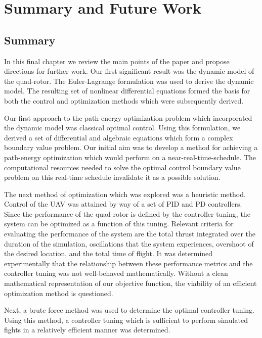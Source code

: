 
\chapter{Summary and Future Work} %

\label{Chapter8}


\section{Summary}
In this final chapter we review the main points of the paper and propose directions for further work. Our first significant result was the dynamic model of the quad-rotor. The Euler-Lagrange formulation was used to derive the dynamic model. The resulting set of nonlinear differential equations formed the basis for both the control and optimization methods which were subsequently derived.

Our first approach to the path-energy optimization problem which incorporated the dynamic model was classical optimal control. Using this formulation, we derived a set of differential and algebraic equations which form a complex boundary value problem. Our initial aim was to develop a method for achieving a path-energy optimization which would perform on a near-real-time-schedule. The computational resources needed to solve the optimal control boundary value problem on this real-time schedule invalidate it as a possible solution.

The next method of optimization which was explored was a heuristic method. Control of the UAV was attained by way of a set of PID and PD controllers. Since the performance of the quad-rotor is defined by the controller tuning, the system can be optimized as a function of this tuning. Relevant criteria for evaluating the performance of the system are the total thrust integrated over the duration of the simulation, oscillations that the system experiences, overshoot of the desired location, and the total time of flight. It was determined experimentally that the relationship between these performance metrics and the controller tuning was not well-behaved mathematically. Without a clean mathematical representation of our objective function, the viability of an efficient optimization method is questioned.

Next, a brute force method was used to determine the optimal controller tuning.  Using this method, a controller tuning which is sufficient to perform simulated fights in a relatively efficient manner was determined.

